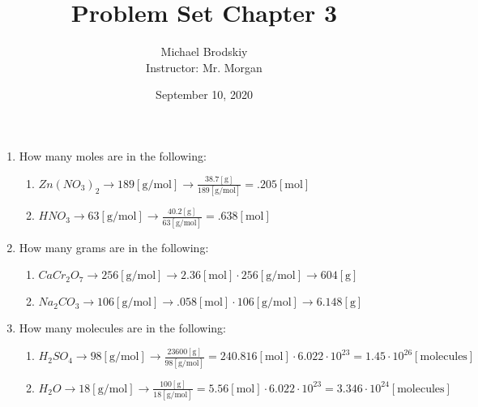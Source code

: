 \documentclass[12pt]{article}
\title{Problem Set Chapter 3}
\date{September 10, 2020}
\author{Michael Brodskiy\\ \small Instructor: Mr. Morgan}
\begin{document}
\maketitle

\begin{enumerate}

  \item How many moles are in the following:

    \begin{enumerate}

      \item $Zn(NO_3)_2\rightarrow189[\si{\gram\per\mole}]\rightarrow\frac{38.7[\si{\gram}]}{189[\si{\gram\per\mole}]}=.205[\si{\mole}]$

      \item $HNO_3\rightarrow63[\si{\gram\per\mole}]\rightarrow\frac{40.2[\si{\gram}]}{63[\si{\gram\per\mole}]}=.638[\si{\mole}]$

    \end{enumerate}

  \item How many grams are in the following:

    \begin{enumerate}

      \item $CaCr_2O_7\rightarrow256[\si{\gram\per\mole}]\rightarrow2.36[\si{\mole}]\cdot256[\si{\gram\per\mole}]\rightarrow604[\si{\gram}]$

      \item $Na_2CO_3\rightarrow106[\si{\gram\per\mole}]\rightarrow.058[\si{\mole}]\cdot106[\si{\gram\per\mole}]\rightarrow6.148[\si{\gram}]$

    \end{enumerate}

  \item How many molecules are in the following:

    \begin{enumerate}

      \item $H_2SO_4\rightarrow98[\si{\gram\per\mole}]\rightarrow\frac{23600[\si{\gram}]}{98[\si{\gram\per\mole}]}=240.816[\si{\mole}]\cdot6.022\cdot10^{23}=1.45\cdot10^{26}[\text{molecules}]$

      \item $H_2O\rightarrow18[\si{\gram\per\mole}]\rightarrow\frac{100[\si{\gram}]}{18[\si{\gram\per\mole}]}=5.56[\si{\mole}]\cdot6.022\cdot10^{23}=3.346\cdot10^{24}[\text{molecules}]$


\end{enumerate}
\end{enumerate}
\end{document}
